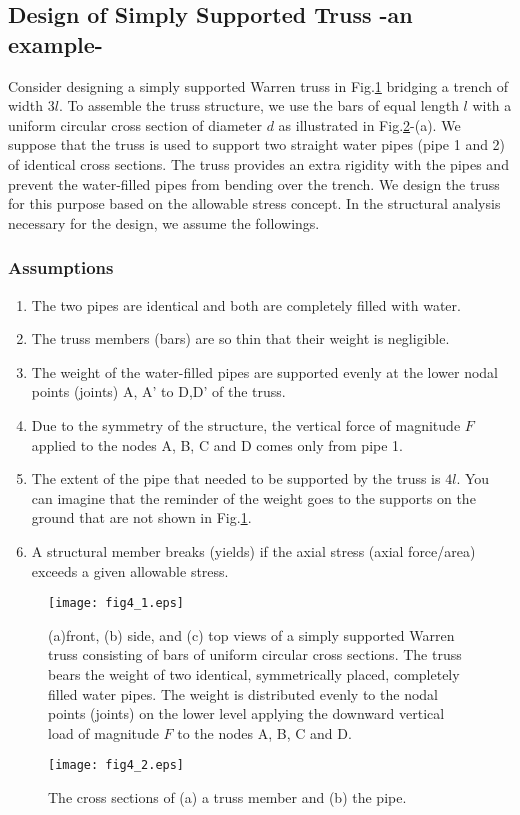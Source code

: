 \documentclass[10pt,a4j]{article}
\begin{document}
\subsection{Design of Simply Supported Truss -an example-}
Consider designing a simply supported Warren truss in Fig.\ref{fig:fig4_1} bridging 
a trench of width $3l$. To assemble the truss structure, we use the bars of equal 
length $l$ with a uniform circular cross section of diameter $d$ as illustrated in Fig.\ref{fig:fig4_2}-(a).
We suppose that the truss is used to support two straight water pipes (pipe 1 and 2) 
of identical cross sections. The truss provides an extra rigidity 
with the pipes and prevent the water-filled pipes from bending over the trench. 
We design the truss for this purpose based on the allowable stress concept.
In the structural analysis necessary for the design, we assume the followings.
\subsubsection{Assumptions}
\begin{enumerate}
\item
	The two pipes are identical and both are completely filled with water. 
\item
	The truss members (bars) are so thin that their weight is negligible.
\item
	The weight of the water-filled pipes are supported evenly at the lower nodal 
		points (joints) A, A' to D,D' of the truss.
\item
	Due to the symmetry of the structure, the vertical force of magnitude 
	$F$ applied to the nodes A, B, C and D comes only from pipe 1.
\item
	The extent of the pipe that needed to be supported by the truss is $4l$. 
	You can imagine that the reminder of the weight goes to the supports on the 
	ground that are not shown in Fig.\ref{fig:fig4_1}.
\item
	A structural member breaks (yields) if the axial stress (axial force/area) 
	exceeds a given allowable stress.
\end{enumerate}
\begin{figure}
	\begin{center}
	\texttt{[image: fig4\_1.eps]} 
	\end{center}
	\caption{
		(a)front, (b) side, and (c) top views of a simply supported Warren truss consisting 
		of bars of uniform circular cross sections. 
		The truss bears the weight of two identical, symmetrically placed, completely filled water pipes.
		The weight is distributed evenly to the nodal points (joints) on the lower level 
		applying the downward vertical load of magnitude $F$ to the nodes A, B, C and D.
	}
	\label{fig:fig4_1}
\end{figure}
\begin{figure}
	\begin{center}
	\texttt{[image: fig4\_2.eps]} 
	\end{center}
	\caption{
		The cross sections of (a) a truss member and (b) the pipe.  
	}
	\label{fig:fig4_2}
\end{figure}
\end{document}
